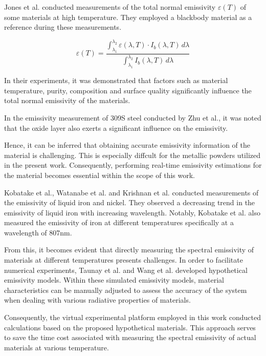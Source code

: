 Jones et al. conducted measurements of the total normal emissivity $\varepsilon(T)$ 
of some materials at high temperature\cite{Jones.2019}. They employed a blackbody
material as a reference during these measurements.

\begin{equation}
    \label{eq: total_normal_emissivity}
    \varepsilon(T) = \frac{\int_{\lambda_1}^{\lambda_2} \varepsilon(\lambda, T) \cdot I_b(\lambda, T)\,d\lambda }{\int_{\lambda_1}^{\lambda_2} I_b(\lambda, T)\,d\lambda}
\end{equation}

In their experiments, it was demonstrated that factors such as material 
temperature, purity, composition and surface quality 
significantly influence the total normal emissivity of the materials.


In the emissivity measurement of 309S steel conducted by Zhu et al., 
it was noted that the oxide layer also exerts a significant 
influence on the emissivity\cite{Zhu.2017}.


Hence, it can be inferred that obtaining accurate emissivity information 
of the material is challenging. This is especially diffcult for the metallic 
powders utilized in the present work. Consequently, performing real-time 
emissivity estimations for the material becomes essential within the scope 
of this work.


Kobatake et al.\cite{Kobatake.2012}, Watanabe et al.\cite{Watanabe.2003} and Krishnan et al.\cite{Krishnan.1997} 
conducted measurements of the emissivity of liquid iron and nickel. 
They observed a decreasing trend in the emissivity of liquid iron with 
increasing wavelength. Notably, Kobatake et al. also measured the emissivity 
of iron at different temperatures specifically at a wavelength of 807nm.


From this, it becomes evident that directly measuring the spectral 
emissivity of materials at different temperatures presents challenges. 
In order to facilitate numerical experiments, Taunay et al.\cite{Taunay.2020b} 
and Wang et al.\cite{Wang.2021b} developed hypothetical emissivity 
models. Within these simulated emissivity models, material characteristics 
can be manually adjusted to assess the accuracy of the system when 
dealing with various radiative properties of materials.


Consequently, the virtual experimental platform employed in this work 
conducted calculations based on the proposed hypothetical materials. 
This approach serves to save the time cost associated with measuring 
the spectral emissivity of actual materials at various temperature.
%
%
